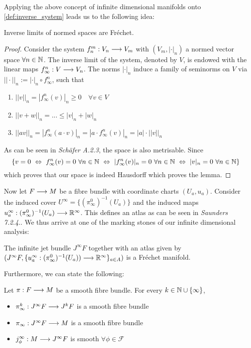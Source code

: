 Applying the above concept of infinite dimensional manifolds onto \ref{def:inverse_system} leads us to the following idea:

\begin{lem}
  Inverse limits of normed spaces are Fréchet.
\begin{proof}
  Consider the system $f^m_n: V_n \longrightarrow V_m$ with $(V_m, |\cdot |_n)$ a normed vector space $\forall n\in \mathbb{N}$. The inverse limit of the system, denoted by $V$, is endowed with the linear maps $f^n_\infty: V  \longrightarrow V_n$. The norms $|\cdot|_n$ induce a family of seminorms on $V$ via $||\cdot ||_n := |\cdot |_n \circ f^n_\infty$, such that
  \begin{enumerate}
    \item $||v||_n = |f^n_\infty(v)|_n \geq 0 \quad \forall v \in V$

    \item $||v+w||_n = ... \leq |v|_n + |w|_n$

    \item $||av||_n = |f^n_\infty(a\cdot v)|_n = |a\cdot f^n_\infty(v)|_n = |a| \cdot ||v||_n$
  \end{enumerate}
  As can be seen in \emph{Schäfer A.2.3}, the space is also metrisable. Since
  $$ \{v = 0 \ \Leftrightarrow \ f^n_\infty(v) = 0 \ \forall n \in \NN \ \Leftrightarrow \ |f^n_\infty(v)|_n = 0 \ \forall n \in \NN \ \Leftrightarrow \ |v|_n = 0 \ \forall n \in \NN \}  $$
  which proves that our space is indeed Hausdorff which proves the lemma.
\end{proof}
\end{lem}

Now let $F\longrightarrow M$ be a fibre bundle with coordinate charts $(U_a, u_a)$. Consider the induced cover $U^\infty = \{ (\pi^0_\infty)^{-1}(U_a) \}$ and the induced maps $u^\infty_a: (\pi^0_\infty)^{-1}(U_a) \longrightarrow \mathbb{R}^\infty$. This defines an atlas as can be seen in \emph{Saunders 7.2.4.}. We thus arrive at one of the marking stones of our infinite dimensional analysis:

\begin{prop}
  The infinite jet bundle $J^\infty F$ together with an atlas given by $(J^\infty F, \{u^\infty_a:(\pi^0_\infty)^{-1}(U_a))\longrightarrow \mathbb{R}^\infty\}_{a\in A})$ is a Fréchet manifold.
\end{prop}

Furthermore, we can state the following:

\begin{prop}
  Let $\pi:F\longrightarrow M$ be a smooth fibre bundle. For every $k \in \mathbb{N} \cup \{\infty\}$,
  \begin{itemize}
    \item $\pi^k_\infty: J^\infty F \longrightarrow J^k F$ is a smooth fibre bundle
    \item $\pi_\infty: J^\infty F \longrightarrow M$ is a smooth fibre bundle
    \item $j_\phi^\infty: M \lra J^\infty F$ is smooth $\forall \phi \in \mathcal{F}$
  \end{itemize}
\end{prop}

